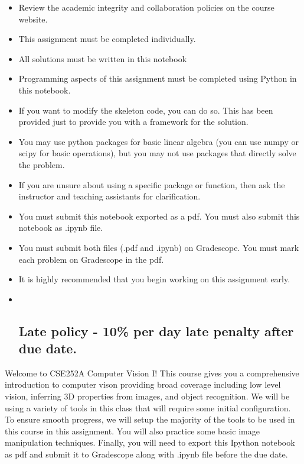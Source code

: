 \documentclass[11pt]{article}
\begin{document}
\begin{itemize}
\item
  Review the academic integrity and collaboration policies on the course
  website.
\item
  This assignment must be completed individually.
\item
  All solutions must be written in this notebook
\item
  Programming aspects of this assignment must be completed using Python
  in this notebook.
\item
  If you want to modify the skeleton code, you can do so. This has been
  provided just to provide you with a framework for the solution.
\item
  You may use python packages for basic linear algebra (you can use
  numpy or scipy for basic operations), but you may not use packages
  that directly solve the problem.
\item
  If you are unsure about using a specific package or function, then ask
  the instructor and teaching assistants for clarification.
\item
  You must submit this notebook exported as a pdf. You must also submit
  this notebook as .ipynb file.
\item
  You must submit both files (.pdf and .ipynb) on Gradescope. You must
  mark each problem on Gradescope in the pdf.
\item
  It is highly recommended that you begin working on this assignment
  early.
\item ~
  \hypertarget{late-policy---10-per-day-late-penalty-after-due-date.}{%
  \subsection{\texorpdfstring{\textbf{Late policy} - 10\% per day late
  penalty after due
  date.}{Late policy - 10\% per day late penalty after due date.}}\label{late-policy---10-per-day-late-penalty-after-due-date.}}
\end{itemize}

Welcome to CSE252A Computer Vision I! This course gives you a
comprehensive introduction to computer vison providing broad coverage
including low level vision, inferring 3D properties from images, and
object recognition. We will be using a variety of tools in this class
that will require some initial configuration. To ensure smooth progress,
we will setup the majority of the tools to be used in this course in
this assignment. You will also practice some basic image manipulation
techniques. Finally, you will need to export this Ipython notebook as
pdf and submit it to Gradescope along with .ipynb file before the due
date.
\end{document}
